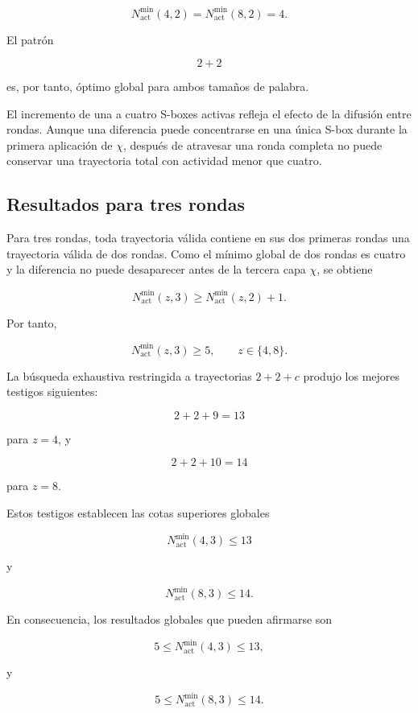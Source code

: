 \[
N_{\mathrm{act}}^{\min}(4,2)
=
N_{\mathrm{act}}^{\min}(8,2)
=
4.
\label{eq:resultado_dos_rondas}
\]

El patrón

\[
2+2
\]

es, por tanto, óptimo global para ambos tamaños de palabra.

El incremento de una a cuatro S-boxes activas refleja el efecto de la
difusión entre rondas. Aunque una diferencia puede concentrarse en una
única S-box durante la primera aplicación de $\chi$, después de atravesar
una ronda completa no puede conservar una trayectoria total con actividad
menor que cuatro.


\subsection{Resultados para tres rondas}
\label{subsec:resultados_tres_rondas}

Para tres rondas, toda trayectoria válida contiene en sus dos primeras
rondas una trayectoria válida de dos rondas. Como el mínimo global de dos
rondas es cuatro y la diferencia no puede desaparecer antes de la tercera
capa $\chi$, se obtiene

\[
N_{\mathrm{act}}^{\min}(z,3)
\geq
N_{\mathrm{act}}^{\min}(z,2)+1.
\]

Por tanto,

\[
N_{\mathrm{act}}^{\min}(z,3)
\geq
5,
\qquad
z\in\{4,8\}.
\label{eq:cota_inferior_tres_rondas}
\]

La búsqueda exhaustiva restringida a trayectorias $2+2+c$ produjo los
mejores testigos siguientes:

\[
2+2+9=13
\]

para $z=4$, y

\[
2+2+10=14
\]

para $z=8$.

Estos testigos establecen las cotas superiores globales

\[
N_{\mathrm{act}}^{\min}(4,3)
\leq
13
\]

y

\[
N_{\mathrm{act}}^{\min}(8,3)
\leq
14.
\]

En consecuencia, los resultados globales que pueden afirmarse son

\[
5
\leq
N_{\mathrm{act}}^{\min}(4,3)
\leq
13,
\label{eq:resultado_tres_rondas_z4}
\]

y

\[
5
\leq
N_{\mathrm{act}}^{\min}(8,3)
\leq
14.
\label{eq:resultado_tres_rondas_z8}
\]


